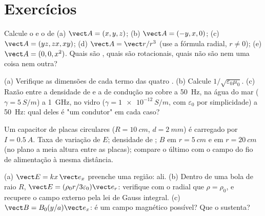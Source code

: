 \section{Exercícios}

\begin{exercise}[$\star$]\label{exo:b2:maxwell-equations:1}
Calcule o  e o  de (a) $\vect A = (x, y, z)$; (b)
$\vect A = (-y, x, 0)$; (c) $\vect A = (yz, zx, xy)$; (d) $\vect A = \vect r/r^3$
(use a fórmula radial, $r \ne 0$); (e) $\vect A = (0, 0, x^2)$. Quais são
, quais são rotacionais, quais não são nem uma coisa nem outra?
\end{exercise}

\begin{exercise}[$\star$]\label{exo:b2:maxwell-equations:2}
(a) Verifique as dimensões de cada termo das quatro .
(b) Calcule $1/\sqrt{\varepsilon_0\mu_0}$. (c) Razão entre a densidade de  e a  de condução no cobre a \qty{50}{Hz}, na
água do mar ($\gamma = \qty{5}{S/m}$) a \qty{1}{GHz}, no vidro ($\gamma =
\qty{1e-12}{S/m}$, com $\varepsilon_0$ por simplicidade) a \qty{50}{Hz}: qual deles é
"um condutor" em cada caso?
\end{exercise}

\begin{exercise}[$\star$]\label{exo:b2:maxwell-equations:3}
Um capacitor de placas circulares ($R = \qty{10}{cm}$, $d = \qty{2}{mm}$) é
carregado por $I = \qty{0.5}{A}$. Taxa de variação de $E$; densidade de ; $B$ em $r = \qty{5}{cm}$ e em $r = \qty{20}{cm}$ (no
plano a meia altura entre as placas); compare o último com o campo do
fio de alimentação à mesma distância.
\end{exercise}

\begin{exercise}[$\star$]\label{exo:b2:maxwell-equations:4}
(a) $\vect E = kx\,\vect e_x$ preenche uma região:  ali. (b)
Dentro de uma bola de raio $R$, $\vect E = (\rho_0r/3\varepsilon_0)\vect e_r$: verifique com
o  radial que $\rho = \rho_0$, e recupere o campo externo
pela lei de Gauss integral. (c) $\vect B = B_0(y/a)\vect e_x$: é um campo
magnético possível? Que  o sustenta?
\end{exercise}

